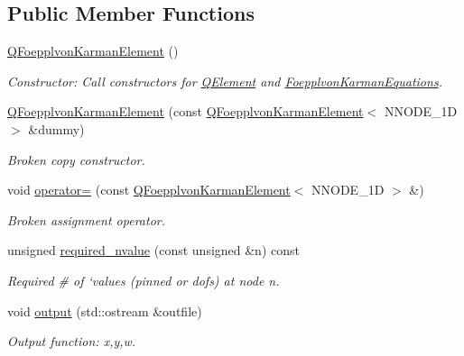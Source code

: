\subsection*{Public Member Functions}
\begin{DoxyCompactItemize}
\item 
\hyperlink{classoomph_1_1QFoepplvonKarmanElement_ab07e4a0c36aeee8d2915ba128b490fb9}{Q\+Foepplvon\+Karman\+Element} ()
\begin{DoxyCompactList}\small\item\em Constructor\+: Call constructors for \hyperlink{classoomph_1_1QElement}{Q\+Element} and \hyperlink{classoomph_1_1FoepplvonKarmanEquations}{Foepplvon\+Karman\+Equations}. \end{DoxyCompactList}\item 
\hyperlink{classoomph_1_1QFoepplvonKarmanElement_a602a5cfd9f1f79ed4bf3a35508b4ca7c}{Q\+Foepplvon\+Karman\+Element} (const \hyperlink{classoomph_1_1QFoepplvonKarmanElement}{Q\+Foepplvon\+Karman\+Element}$<$ N\+N\+O\+D\+E\+\_\+1D $>$ \&dummy)
\begin{DoxyCompactList}\small\item\em Broken copy constructor. \end{DoxyCompactList}\item 
void \hyperlink{classoomph_1_1QFoepplvonKarmanElement_a43024063c1688999c250f2becf0a1ab6}{operator=} (const \hyperlink{classoomph_1_1QFoepplvonKarmanElement}{Q\+Foepplvon\+Karman\+Element}$<$ N\+N\+O\+D\+E\+\_\+1D $>$ \&)
\begin{DoxyCompactList}\small\item\em Broken assignment operator. \end{DoxyCompactList}\item 
unsigned \hyperlink{classoomph_1_1QFoepplvonKarmanElement_a9fb4b0ecf405369f564e0c8c6a169d00}{required\+\_\+nvalue} (const unsigned \&n) const
\begin{DoxyCompactList}\small\item\em Required \# of `values\textquotesingle{} (pinned or dofs) at node n. \end{DoxyCompactList}\item 
void \hyperlink{classoomph_1_1QFoepplvonKarmanElement_a283a3078077c6feefb9894e17e9f7b7a}{output} (std\+::ostream \&outfile)
\begin{DoxyCompactList}\small\item\em Output function\+: x,y,w. \end{DoxyCompactList}\item 

\end{DoxyCompactItemize}
